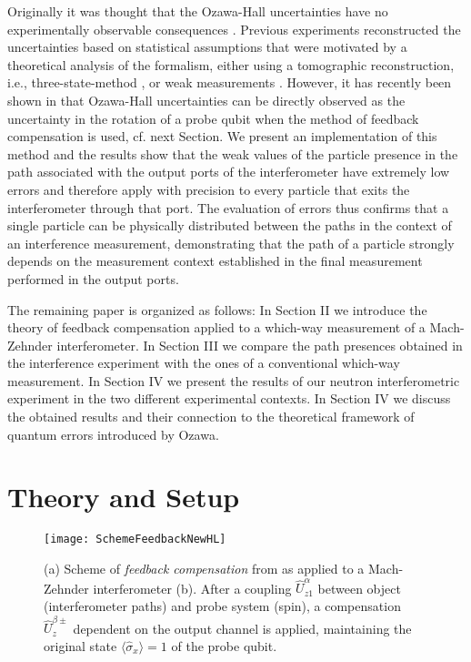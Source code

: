 \documentclass[english,keywords,aps,twocolumn]{revtex4-1}
\begin{document}
Originally it was thought that the Ozawa-Hall uncertainties have no experimentally observable consequences \cite{Werner04}. Previous experiments reconstructed the uncertainties based on statistical assumptions that were motivated by a theoretical analysis of the formalism, either using a tomographic reconstruction, i.e., three-state-method \cite{Ozawa04,Erhart12,Edamatsu13,Sulyok13,Ringbauer14,Sulyok17}, or weak measurements \cite{Lund10,Steinberg12}. However, it has recently been shown in \cite{Hofmann21} that Ozawa-Hall uncertainties can be directly observed as the uncertainty in the rotation of a probe qubit when the method of feedback compensation is used, cf. next Section. We present an implementation of this method and
the results show that the weak values of the particle presence in the path associated with the output ports of the interferometer have extremely low errors and therefore apply with precision to every particle that exits the interferometer through that port. The evaluation of errors thus confirms that a single particle can be physically distributed between the paths in the context of an interference measurement, demonstrating that the path of a particle strongly depends on the measurement context established in the final measurement performed in the output ports.

The remaining paper is organized as follows: In Section II we introduce the theory of feedback compensation applied to a which-way measurement of a Mach-Zehnder interferometer. In Section III we compare the path presences obtained in the interference experiment with the ones of a conventional which-way measurement.
In Section IV we present the results of our neutron interferometric experiment in the two different experimental contexts. In Section IV we discuss the obtained results and their connection to the theoretical framework of quantum errors introduced by Ozawa.


\section{Theory and Setup} \label{sec:theory}

\begin{figure}
{\texttt{[image: SchemeFeedbackNewHL]}}
\caption{(a) Scheme of \emph{feedback compensation} from \cite{Hofmann21} as applied to a Mach-Zehnder interferometer (b).  After a coupling $\hat U^\alpha_{z1}$ between object (interferometer paths) and probe system (spin), a compensation $\hat U_z^{\beta\pm}$ dependent on the output channel is applied, maintaining the original state $\langle\hat\sigma_x\rangle=1$ of the probe qubit.  }\label{fig:schemeFeedback}
\end{figure}
\end{document}
